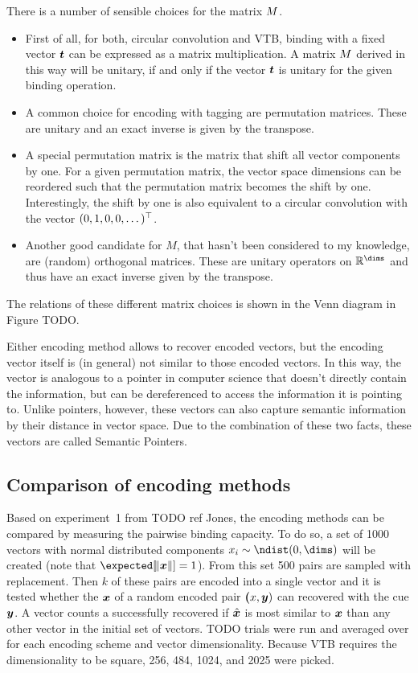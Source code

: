 There is a number of sensible choices for the matrix $M$.
\begin{itemize}
    \item First of all, for both, circular convolution and VTB, binding with a fixed vector $\bm{t}$ can be expressed as a matrix multiplication.
        A matrix $M$ derived in this way will be unitary, if and only if the vector $\bm{t}$ is unitary for the given binding operation.
    \item A common choice for encoding with tagging are permutation matrices.
        These are unitary and an exact inverse is given by the transpose.
    \item A special permutation matrix is the matrix that shift all vector components by one.
        For a given permutation matrix, the vector space dimensions can be reordered such that the permutation matrix becomes the shift by one.
        Interestingly, the shift by one is also equivalent to a circular convolution with the vector $(0, 1, 0, 0, \dotsc)^{\top}$.
    \item Another good candidate for $M$, that hasn't been considered to my knowledge, are (random) orthogonal matrices.
        These are unitary operators on $\mathbb{R}^{\dims}$ and thus have an exact inverse given by the transpose.
\end{itemize}
The relations of these different matrix choices is shown in the Venn diagram in Figure TODO\@.

Either encoding method allows to recover encoded vectors, but the encoding vector itself is (in general) not similar to those encoded vectors.
In this way, the vector is analogous to a pointer in computer science that doesn't directly contain the information, but can be dereferenced to access the information it is pointing to.
Unlike pointers, however, these vectors can also capture semantic information by their distance in vector space.
Due to the combination of these two facts, these vectors are called Semantic Pointers. 


\subsection{Comparison of encoding methods}
Based on experiment~1 from TODO ref Jones, the encoding methods can be compared by measuring the pairwise binding capacity.
To do so, a set of \num{1000} vectors with normal distributed components $x_i \sim \ndist(0, \dims)$ will be created (note that $\expected[\norm{\vc x}] = 1$).
From this set \num{500} pairs are sampled with replacement.
Then $k$ of these pairs are encoded into a single vector and it is tested whether the $\bm{x}$ of a random encoded pair $\bm{(}x, \bm{y})$ can recovered with the cue $\bm{y}$.
A vector counts a successfully recovered if $\hat{\bm{x}}$ is most similar to $\bm{x}$ than any other vector in the initial set of vectors.
TODO trials were run and averaged over for each encoding scheme and vector dimensionality.
Because VTB requires the dimensionality to be square, \num{256}, \num{484}, \num{1024}, and \num{2025} were picked.

